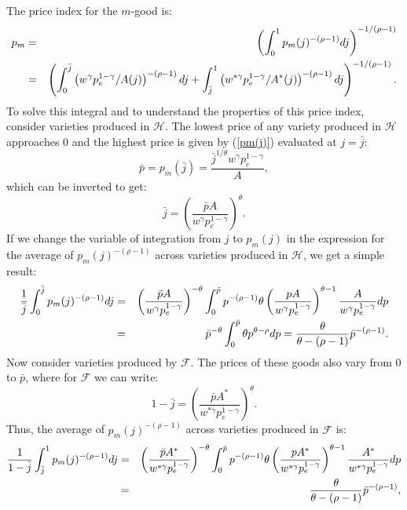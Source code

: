 \documentclass[notitlepage,12pt]{article}
\begin{document}
The price index for the $m$-good is:%
\begin{eqnarray}
p_{m} &=&\left( \int_{0}^{1}p_{m}(j)^{-\left( \rho -1\right) }dj\right)
^{-1/\left( \rho -1\right) }  \notag \\
&=&\left( \int_{0}^{\bar{j}}\left( w^{\gamma }p_{e}^{1-\gamma }/A(j)\right)
^{-\left( \rho -1\right) }dj+\int_{\bar{j}}^{1}\left( w^{\ast \gamma
}p_{e}^{1-\gamma }/A^{\ast }(j)\right) ^{-\left( \rho -1\right) }dj\right)
^{-1/\left( \rho -1\right) }.  \label{manufacturing price index definition}
\end{eqnarray}%
To solve this integral and to understand the properties of this price index,
consider varieties produced in $\mathcal{H}$. The lowest price of any
variety produced in $\mathcal{H}$ approaches $0$ and the highest price is
given by (\ref{pm(j)}) evaluated at $j=\bar{j}$:%
\begin{equation}
\bar{p}=p_{m}(\bar{j})=\frac{\bar{j}^{1/\theta }w^{\gamma }p_{e}^{1-\gamma }%
}{A},  \label{pbar}
\end{equation}%
which can be inverted to get:%
\begin{equation*}
\bar{j}=\left( \frac{\bar{p}A}{w^{\gamma }p_{e}^{1-\gamma }}\right) ^{\theta
}.
\end{equation*}%
If we change the variable of integration from $j$ to $p_{m}(j)$ in the
expression for the average of $p_{m}(j)^{-(\rho -1)}$ across varieties
produced in $\mathcal{H}$, we get a simple result:%
\begin{eqnarray*}
\frac{1}{\bar{j}}\int_{0}^{\bar{j}}p_{m}(j)^{-\left( \rho -1\right) }dj
&=&\left( \frac{\bar{p}A}{w^{\gamma }p_{e}^{1-\gamma }}\right) ^{-\theta
}\int_{0}^{\bar{p}}p^{-(\rho -1)}\theta \left( \frac{pA}{w^{\gamma
}p_{e}^{1-\gamma }}\right) ^{\theta -1}\frac{A}{w^{\gamma }p_{e}^{1-\gamma }}%
dp \\
&=&\bar{p}^{-\theta }\int_{0}^{\bar{p}}\theta p^{\theta -\rho }dp=\frac{%
\theta }{\theta -\left( \rho -1\right) }\bar{p}^{-\left( \rho -1\right) }.
\end{eqnarray*}%
Now consider varieties produced by $\mathcal{F}$. The prices of these goods
also vary from $0$ to $\bar{p}$, where for $\mathcal{F}$ we can write:%
\begin{equation*}
1-\bar{j}=\left( \frac{\bar{p}A^{\ast }}{w^{\ast \gamma }p_{e}^{1-\gamma }}%
\right) ^{\theta }.
\end{equation*}%
Thus, the average of $p_{m}(j)^{-(\rho -1)}$ across varieties produced in $%
\mathcal{F}$ is:%
\begin{eqnarray*}
\frac{1}{1-\bar{j}}\int_{\bar{j}}^{1}p_{m}(j)^{-\left( \rho -1\right) }dj
&=&\left( \frac{\bar{p}A^{\ast }}{w^{\ast \gamma }p_{e}^{1-\gamma }}\right)
^{-\theta }\int_{0}^{\bar{p}}p^{-(\rho -1)}\theta \left( \frac{pA^{\ast }}{%
w^{\ast \gamma }p_{e}^{1-\gamma }}\right) ^{\theta -1}\frac{A^{\ast }}{%
w^{\ast \gamma }p_{e}^{1-\gamma }}dp \\
&=&\frac{\theta }{\theta -\left( \rho -1\right) }\bar{p}^{-\left( \rho
-1\right) },
\end{eqnarray*}%
\end{document}
